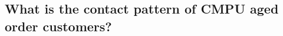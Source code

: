 \subsection{What is the contact pattern of CMPU aged order customers?}
\label{subsec:contact-analysis}











